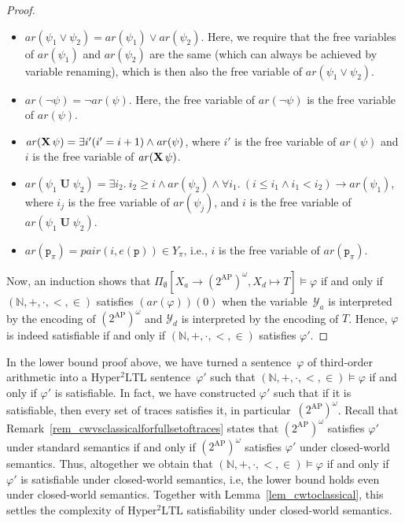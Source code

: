 \documentclass[dvipsnames,10pt,a4paper]{amsart}
\theoremstyle{definition}
\theoremstyle{remark}
\newcommand{\nats}{\mathbb{N}}
\renewcommand{\phi}{\varphi}
\newcommand{\pow}[1]{2^{#1}}
\DeclareMathOperator{\U}{\mathbf{U}}
\newcommand{\X}{\mathop{\mathbf{X}\vphantom{a}}\nolimits}
\newcommand{\sohyltl}{\mathrm{Hyper^2LTL}\xspace}
\newcommand{\ap}[0]{\mathrm{AP}}
\newcommand{\univar}{X_a}
\newcommand{\unidisvar}{X_d}
\newcommand{\proposition}{\texttt{p}}
\newcommand{\arithmetize}{{\mathit{ar}}}
\newcommand{\pair}{\mathit{pair}}
\newcommand{\calY}{\mathcal{Y}}
\newcommand{\natsstruct}{(\nats, +, \cdot, <, \in)}
\begin{document}
\begin{proof}
\begin{itemize}
    \item $\arithmetize(\psi_1 \vee \psi_2) = \arithmetize(\psi_1) \vee \arithmetize(\psi_2)$. Here, we require that the free variables of $\arithmetize(\psi_1)$ and $\arithmetize(\psi_2)$ are the same (which can always be achieved by variable renaming), which is then also the free variable of $\arithmetize(\psi_1 \vee \psi_2)$.
    
    \item $\arithmetize(\neg\psi) = \neg\arithmetize(\psi)$. Here, the free variable of $\arithmetize(\neg\psi) $ is the free variable of $ \arithmetize(\psi)$.
    
     \item $\arithmetize(\X\psi) =  \exists i' (i' = i+1) \wedge \arithmetize(\psi)$, where $i'$ is the free variable of $\arithmetize(\psi)$ and $i$ is the free variable of $\arithmetize(\X\psi)$.
    
    \item $\arithmetize(\psi_1\U\psi_2) =  \exists i_2.\ i_2 \ge i \wedge \arithmetize(\psi_2) \wedge \forall i_1.\ (i \le i_1 \wedge i_1 < i_2) \rightarrow \arithmetize(\psi_1)$, where $i_j$ is the free variable of $\arithmetize(\psi_j)$, %
    and $i$ is the free variable of $\arithmetize(\psi_1\U\psi_2)$.

    \item $\arithmetize(\proposition_\pi) = \pair(i,e(\proposition)) \in Y_\pi$, i.e., $i$ is the free variable of $\arithmetize(\proposition_\pi)$.
    
\end{itemize}
Now, an induction shows that $\Pi_\emptyset[\univar\rightarrow (\pow{\ap})^\omega, \unidisvar \mapsto T] \models \phi$ if and only if $\natsstruct$ satisfies $(\arithmetize(\phi))(0)$ when the variable~$\calY_a$ is interpreted by the encoding of $(\pow{\ap})^\omega$ and $\calY_d$ is interpreted by the encoding of $T$.
Hence, $\phi$ is indeed satisfiable if and only if $\natsstruct$ satisfies $\phi'$.
\end{proof}

In the lower bound proof above, we have turned a sentence~$\phi$ of third-order arithmetic into a $\sohyltl$ sentence~$\phi'$ such that $\natsstruct\models\phi$  if and only if  $\phi'$ is satisfiable. 
In fact, we have constructed $\phi'$ such that if it is satisfiable, then every set of traces satisfies it, in particular~$(\pow{\ap})^\omega$.
Recall that Remark~\ref{rem_cwvsclassicalforfullsetoftraces} states that $(\pow{\ap})^\omega$ satisfies $\phi'$ under standard semantics if and only if $(\pow{\ap})^\omega$ satisfies $\phi'$ under closed-world semantics.
Thus, altogether we obtain that $\natsstruct\models\phi$  if and only if  $\phi'$ is satisfiable under closed-world semantics, i.e, the lower bound holds even under closed-world semantics.
Together with Lemma~\ref{lem_cwtoclassical}, this settles the complexity of $\sohyltl$ satisfiability under closed-world semantics.
\end{document}
